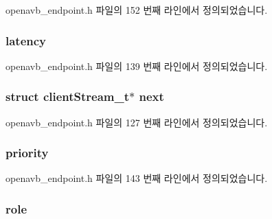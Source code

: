 openavb\+\_\+endpoint.\+h 파일의 152 번째 라인에서 정의되었습니다.

\subsubsection[{\texorpdfstring{latency}{latency}}]{ latency}\hypertarget{structclient_stream__t_ae16309c230017ae952e8a54441556efc}{}\label{structclient_stream__t_ae16309c230017ae952e8a54441556efc}


openavb\+\_\+endpoint.\+h 파일의 139 번째 라인에서 정의되었습니다.

\subsubsection[{\texorpdfstring{next}{next}}]{\setlength{\rightskip}{0pt plus 5cm}struct {\bf client\+Stream\+\_\+t}$\ast$ next}\hypertarget{structclient_stream__t_a86d1d9f69aff01fa547c5033d251dedf}{}\label{structclient_stream__t_a86d1d9f69aff01fa547c5033d251dedf}


openavb\+\_\+endpoint.\+h 파일의 127 번째 라인에서 정의되었습니다.

\subsubsection[{\texorpdfstring{priority}{priority}}]{ priority}\hypertarget{structclient_stream__t_a311f8b040417772c36534cb9ba9612d5}{}\label{structclient_stream__t_a311f8b040417772c36534cb9ba9612d5}


openavb\+\_\+endpoint.\+h 파일의 143 번째 라인에서 정의되었습니다.

\subsubsection[{\texorpdfstring{role}{role}}]{ role}\hypertarget{structclient_stream__t_ab03c4375a8fc370d6f701f4e35556b10}{}\label{structclient_stream__t_ab03c4375a8fc370d6f701f4e35556b10}


